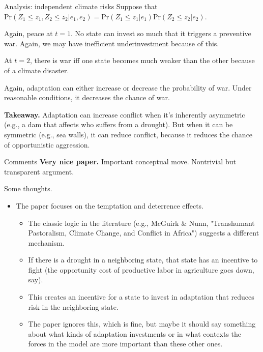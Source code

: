 \documentclass[ignorenonframetext,c,12pt]{beamer}
\providecommand{\tightlist}{%
  \setlength{\itemsep}{0pt}\setlength{\parskip}{0pt}}
\def\Pr{\text{Pr}}
\let\leq=\leqslant %
\begin{document}
\begin{frame}{Analysis: independent climate risks}
  Suppose that $\Pr(Z_1 \leq z_1, Z_2 \leq z_2 | e_1, e_2) = \Pr(Z_1 \leq z_1 | e_1) \Pr(Z_2 \leq z_2 | e_2)$.

  Again, peace at $t=1$. No state can invest so much that it triggers a preventive war. Again, we may have inefficient underinvestment because of this.

  At $t=2$, there is war iff one state becomes much weaker than the other because of a climate disaster.

  Again, adaptation can either increase or decrease the probability of war. Under reasonable conditions, it decreases the chance of war.

  \textbf{Takeaway.} Adaptation can increase conflict when it's inherently asymmetric (e.g., a dam that affects who suffers from a drought). But when it can be symmetric (e.g., sea walls), it can reduce conflict, because it reduces the chance of opportunistic aggression.
\end{frame}

\begin{frame}{Comments}\vspace{0.5em}
  \textbf{Very nice paper.} Important conceptual move. Nontrivial but transparent argument.

  Some thoughts.
  \begin{itemize}
    \item The paper focuses on the temptation and deterrence effects.
    \begin{itemize}\tightlist
      \item The classic logic in the literature (e.g., McGuirk \& Nunn, "Transhumant Pastoralism, Climate Change, and Conflict in Africa") suggests a different mechanism.
      \item If there is a drought in a neighboring state, that state has an incentive to fight (the opportunity cost of productive labor in agriculture goes down, say).
      \item This creates an incentive for a state to invest in adaptation that reduces risk in the neighboring state.
      \item The paper ignores this, which is fine, but maybe it should say something about what kinds of adaptation investments or in what contexts the forces in the model are more important than these other ones.
    \end{itemize}
  \end{itemize}
\end{frame}
\end{document}
